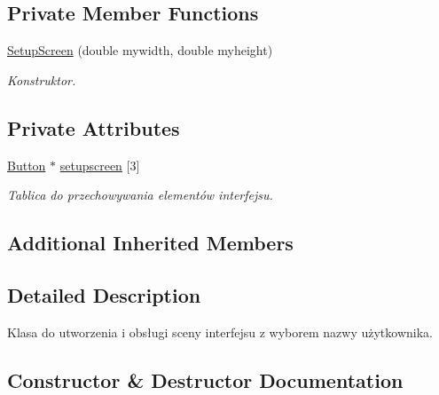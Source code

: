 \subsection*{Private Member Functions}
\begin{DoxyCompactItemize}
\item 
\mbox{\hyperlink{class_setup_screen_a7e68549c089321932b410f829d82d157}{Setup\+Screen}} (double mywidth, double myheight)
\begin{DoxyCompactList}\small\item\em Konstruktor. \end{DoxyCompactList}\end{DoxyCompactItemize}
\subsection*{Private Attributes}
\begin{DoxyCompactItemize}
\item 
\mbox{\label{class_setup_screen_a26943719234aa28944cbd999c887887a}} 
\mbox{\hyperlink{class_button}{Button}} $\ast$ \mbox{\hyperlink{class_setup_screen_a26943719234aa28944cbd999c887887a}{setupscreen}} \mbox{[}3\mbox{]}
\begin{DoxyCompactList}\small\item\em Tablica do przechowywania elementów interfejsu. \end{DoxyCompactList}\end{DoxyCompactItemize}
\subsection*{Additional Inherited Members}


\subsection{Detailed Description}
Klasa do utworzenia i obsługi sceny interfejsu z wyborem nazwy użytkownika. 

\subsection{Constructor \& Destructor Documentation}
\mbox{\label{class_setup_screen_a7e68549c089321932b410f829d82d157}} 
